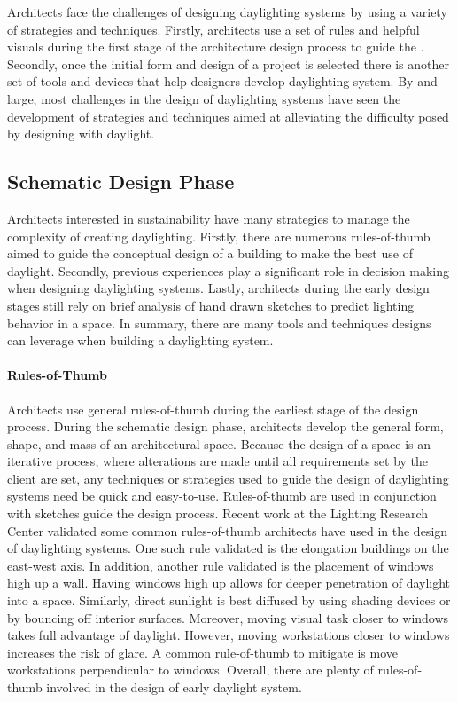   Architects face the challenges of designing daylighting systems by using a variety of strategies and techniques.
  Firstly, architects use a set of rules and helpful visuals during the first stage of the architecture design process to guide the . 
  Secondly, once the initial form and design of a project is selected there is another set of tools and devices that help designers develop daylighting system.
  By and large, most challenges in the design of daylighting systems have seen the development of strategies and techniques aimed at alleviating the difficulty posed by designing with daylight.\\

  \subsection{Schematic Design Phase}
    Architects interested in sustainability have many strategies to manage the complexity of creating daylighting.
    Firstly, there are numerous rules-of-thumb aimed to guide the conceptual design of a building to make the best use of daylight.
    Secondly, previous experiences play a significant role in decision making when designing daylighting systems. Lastly, architects during the early design stages still rely on brief analysis of hand drawn sketches to predict lighting behavior in a space. In summary, there are many tools and techniques designs can leverage when building a daylighting system.\\

    \paragraph{Rules-of-Thumb}
    Architects use general rules-of-thumb during the earliest stage of the design process. 
    During the schematic design phase, architects develop the general form, shape, and mass of an architectural space.
    Because the design of a space is an iterative process, where alterations are made until all requirements set by the client are set\cite{Suwa}, any techniques or strategies used to guide the design of daylighting systems need be quick and easy-to-use. Rules-of-thumb are used in conjunction with sketches guide the design process.
    Recent work at the Lighting Research Center validated some common rules-of-thumb architects have used in the design of daylighting systems\cite{Leslie}.
    One such rule validated is the elongation buildings on the east-west axis.
    In addition, another rule validated is the placement of windows high up a wall.
    Having windows high up allows for deeper penetration of daylight into a space.
    Similarly, direct sunlight is best diffused by using shading devices or by bouncing off interior surfaces.
    Moreover, moving visual task closer to windows takes full advantage of daylight.
    However, moving workstations closer to windows increases the risk of glare. A common rule-of-thumb to mitigate is move workstations perpendicular to windows.
    Overall, there are plenty of rules-of-thumb involved in the design of early daylight system.\\

